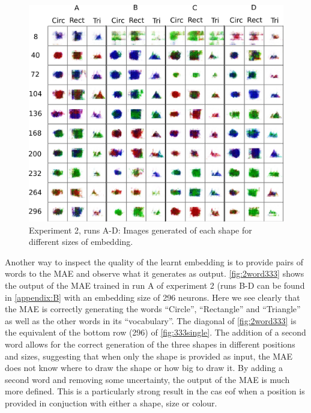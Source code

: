 \begin{figure}
\centering
\includegraphics[width=\textwidth]{Figs/shapes/shapes333.png}
\caption{Experiment 2, runs A-D:  Images generated of each shape for different sizes of embedding.}
\label{fig:shapes333}
\end{figure}

Another way to inspect the quality of the learnt embedding is to provide pairs of words to the MAE and observe what it generates as output. \autoref{fig:2word333} shows the output of the MAE trained in run A of experiment 2 (runs B-D can be found in \autoref{appendix:B} with an embedding size of 296 neurons. Here we see clearly that the MAE is correctly generating the words ``Circle'', ``Rectangle'' and ``Triangle'' as well as the other words in its ``vocabulary''. The diagonal of \autoref{fig:2word333} is the equivalent of the bottom row (296) of \autoref{fig:333single}. The addition of a second word allows for the correct generation of the three shapes in different positions and sizes, suggesting that when only the shape is provided as input, the MAE does not know where to draw the shape or how big to draw it. By adding a second word and removing some uncertainty, the output of the MAE is much more defined. This is a particularly strong result in the cas eof when a position is provided in conjuction with either a shape, size or colour. 

